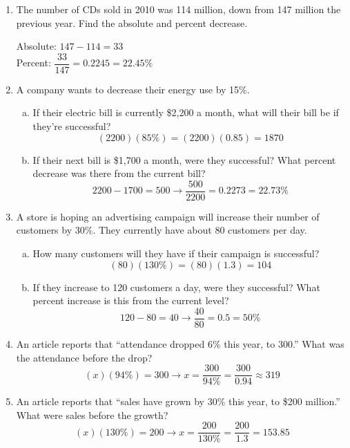 \begin{enumerate}
\item The number of CDs sold in 2010 was 114 million, down from 147 million the previous year.  Find the absolute and percent decrease. 
\begin{center}
Absolute: $147 - 114 = 33$\\
Percent: $\dfrac{33}{147} = 0.2245 = 22.45\%$
\end{center}

\item A company wants to decrease their energy use by 15\%.
\begin{enumerate}[(a)]
\item If their electric bill is currently \$2,200 a month, what will their bill be if they're successful? 
\[(2200)(85\%) = (2200)(0.85) = 1870\]

\item If their next bill is \$1,700 a month, were they successful?  What percent decrease was there from the current bill? 
\[2200 - 1700 = 500 \longrightarrow \dfrac{500}{2200} = 0.2273 = 22.73\%\]
\end{enumerate}

\item A store is hoping an advertising campaign will increase their number of customers by 30\%.  They currently have about 80 customers per day.
\begin{enumerate}[(a)]
\item How many customers will they have if their campaign is successful? 
\[(80)(130\%) = (80)(1.3) = 104\]

\item If they increase to 120 customers a day, were they successful?  What percent increase is this from the current level? 
\[120 - 80 = 40 \longrightarrow \dfrac{40}{80} = 0.5 = 50\%\]
\end{enumerate}

\item An article reports that ``attendance dropped 6\% this year, to 300.''  What was the attendance before the drop? 
\[(x)(94\%) = 300 \longrightarrow x = \dfrac{300}{94\%} = \dfrac{300}{0.94} \approx 319\]

\item An article reports that ``sales have grown by 30\% this year, to \$200 million.''  What were sales before the growth? 
\[(x)(130\%) = 200 \longrightarrow x = \dfrac{200}{130\%} = \dfrac{200}{1.3} = 153.85\]


\end{enumerate}

